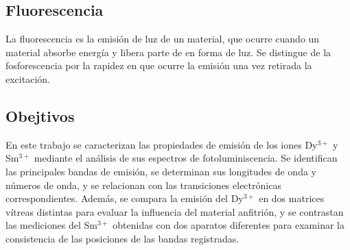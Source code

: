 \subsection{Fluorescencia}
La fluorescencia es la emisión de luz de un material, que ocurre cuando un material absorbe energía y libera parte de en forma de luz. Se distingue de la fosforescencia por la rapidez en que ocurre la emisión una vez retirada la excitación. \cite{RighiniFerrari2005}
\subsection{Obejtivos}
En este trabajo se caracterizan las propiedades de emisión de los iones
Dy$^{3+}$ y Sm$^{3+}$ mediante el análisis de sus espectros de
fotoluminiscencia. Se identifican las principales bandas de emisión,
se determinan sus longitudes de onda y números de onda, y se relacionan
con las transiciones electrónicas correspondientes. Además, se compara
la emisión del Dy$^{3+}$ en dos matrices vítreas distintas para evaluar
la influencia del material anfitrión, y se contrastan las mediciones
del Sm$^{3+}$ obtenidas con dos aparatos diferentes para examinar la
consistencia de las posiciones de las bandas registradas.